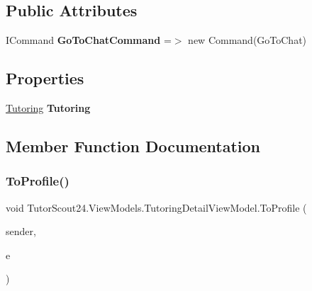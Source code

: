 \subsection*{Public Attributes}
\begin{DoxyCompactItemize}
\item 
\mbox{\label{class_tutor_scout24_1_1_view_models_1_1_tutoring_detail_view_model_a8c17194cfa90dbd7c4e90d356771cac9}} 
I\+Command {\bfseries Go\+To\+Chat\+Command} =$>$ new Command(Go\+To\+Chat)
\end{DoxyCompactItemize}
\subsection*{Properties}
\begin{DoxyCompactItemize}
\item 
\mbox{\label{class_tutor_scout24_1_1_view_models_1_1_tutoring_detail_view_model_af98e98d4167f4e9762a3930123e19819}} 
\mbox{\hyperlink{class_tutor_scout24_1_1_models_1_1_tutorings_1_1_tutoring}{Tutoring}} {\bfseries Tutoring}
\end{DoxyCompactItemize}


\subsection{Member Function Documentation}
\mbox{\label{class_tutor_scout24_1_1_view_models_1_1_tutoring_detail_view_model_ae8b5bb8d8ebd4cc6425f52674fddc288}} 
\subsubsection{\texorpdfstring{To\+Profile()}{ToProfile()}}
{\footnotesize\ttfamily void Tutor\+Scout24.\+View\+Models.\+Tutoring\+Detail\+View\+Model.\+To\+Profile (\begin{DoxyParamCaption}\item[{object}]{sender,  }\item[{Event\+Args}]{e }\end{DoxyParamCaption})\hspace{0.3cm}{\ttfamily [inline]}}



